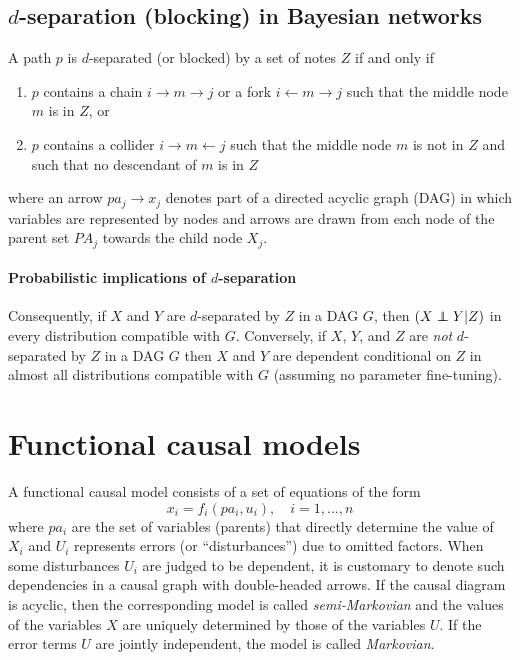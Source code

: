 \documentclass[11pt]{article}
\numberwithin{equation}{section}
\newcommand\indep{\protect\mathpalette{\protect\independenT}{\perp}}
\def\independenT#1#2{\mathrel{\rlap{$#1#2$}\mkern2mu{#1#2}}}
\begin{document}
\subsection{$d$-separation (blocking) in Bayesian networks} \label{sec:blocking}
A path $p$ is $d$-separated (or blocked) by a set of notes $Z$ if and only if
\begin{enumerate}[noitemsep]
\item $p$ contains a chain $i \rightarrow m \rightarrow j$ or a fork $i \leftarrow m \rightarrow j$ such that the middle node $m$ is in $Z$, or
\item $p$ contains a collider $i \rightarrow m \leftarrow j$ such that the middle node $m$ is not in $Z$ and such that no descendant of $m$ is in $Z$
\end{enumerate}
where an arrow $pa_j \rightarrow x_j$ denotes part of a directed acyclic graph (DAG) in which variables are represented by nodes and arrows are drawn from each node of the parent set $PA_j$ towards the child node $X_j$.

\paragraph{Probabilistic implications of $d$-separation} 
Consequently, if $X$ and $Y$ are $d$-separated by $Z$ in a DAG $G$, then $(X \indep Y | Z)$ in every distribution compatible with $G$. Conversely, if $X$, $Y$, and $Z$ are \textit{not} $d$-separated by $Z$ in a DAG $G$ then $X$ and $Y$ are dependent conditional on $Z$ in almost all distributions compatible with $G$ (assuming no parameter fine-tuning).

\section{Functional causal models}
A functional causal model consists of a set of equations of the form
\begin{equation}
x_i = f_i(pa_i, u_i), \quad i=1,...,n \label{eq:func-caus-mod}
\end{equation}
where $pa_i$ are the set of variables (parents) that directly determine the value of $X_i$ and $U_i$ represents errors (or ``disturbances'') due to omitted factors. When some disturbances $U_i$ are judged to be dependent, it is customary to denote such dependencies in a causal graph with double-headed arrows. If the causal diagram is acyclic, then the corresponding model is called \textit{semi-Markovian} and the values of the variables $X$ are uniquely determined by those of the variables $U$. If the error terms $U$ are jointly independent, the model is called \textit{Markovian}.
\end{document}
